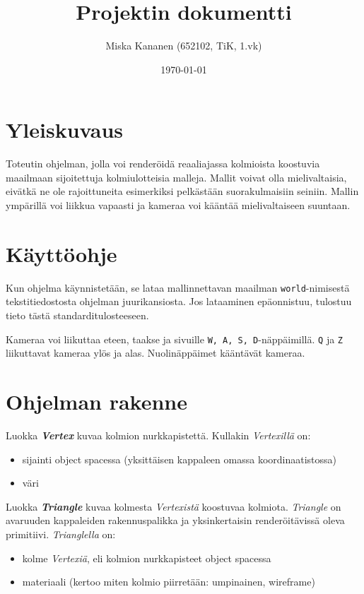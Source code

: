 \documentclass[12pt] {article}
\begin{document}
\title {Projektin dokumentti}
\author {Miska Kananen (652102, TiK, 1.vk)}
\date {\today}
\maketitle

\tableofcontents

\section {Yleiskuvaus}

Toteutin ohjelman, jolla voi renderöidä reaaliajassa kolmioista koostuvia maailmaan sijoitettuja kolmiulotteisia malleja. Mallit voivat olla mielivaltaisia, eivätkä ne ole rajoittuneita esimerkiksi pelkästään suorakulmaisiin seiniin. Mallin ympärillä voi liikkua vapaasti ja kameraa voi kääntää mielivaltaiseen suuntaan.

\section {Käyttöohje}

Kun ohjelma käynnistetään, se lataa mallinnettavan maailman \texttt{world}-nimisestä tekstitiedostosta ohjelman juurikansiosta. Jos lataaminen epäonnistuu, tulostuu tieto tästä standarditulosteeseen.

Kameraa voi liikuttaa eteen, taakse ja sivuille \texttt{W, A, S, D}-näppäimillä. \texttt{Q} ja \texttt{Z} liikuttavat kameraa ylös ja alas. Nuolinäppäimet kääntävät kameraa.

\section {Ohjelman rakenne}

Luokka \textit{\textbf{Vertex}} kuvaa kolmion nurkkapistettä. Kullakin \textit{Vertexillä} on:
\begin{itemize}
	\item sijainti object spacessa (yksittäisen kappaleen omassa koordinaatistossa)
	\item väri
\end{itemize}

Luokka \textit{\textbf{Triangle}} kuvaa kolmesta \textit{Vertexistä} koostuvaa kolmiota. \textit{Triangle} on avaruuden kappaleiden rakennuspalikka ja yksinkertaisin renderöitävissä oleva primitiivi. \textit{Trianglella} on:
\begin{itemize}
	\item kolme \textit{Vertexiä}, eli kolmion nurkkapisteet object spacessa
	\item materiaali (kertoo miten kolmio piirretään: umpinainen, wireframe)
\end{itemize}
\end{document}
